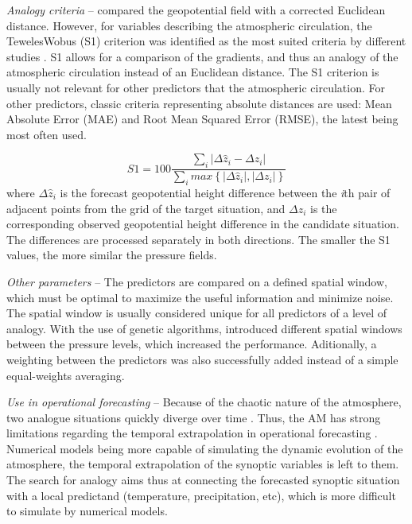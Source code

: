 \documentclass[review]{elsarticle}
\begin{document}
\textit{Analogy criteria} -- \citet{Lorenz1969} compared the geopotential field with a corrected Euclidean distance. However, for variables describing the atmospheric circulation, the Teweles\textendash Wobus (S1) criterion \citep[Eq. (\ref{eq:S1}), ][]{Teweles1954, Drosdowsky2003} was identified as the most suited criteria by different studies \citep{Wilson1980, Woodcock1980, Guilbaud1998, Bontron2004}. S1 allows for a comparison of the gradients, and thus an analogy of the atmospheric circulation instead of an Euclidean distance. The S1 criterion is usually not relevant for other predictors that the atmospheric circulation. For other predictors, classic criteria representing absolute distances are used: Mean Absolute Error (MAE) and Root Mean Squared Error (RMSE), the latest being most often used.

\begin{equation}
\label{eq:S1}
S1=100 \frac {\displaystyle \sum_{i} \vert \Delta\hat{z}_{i} - \Delta z_{i} \vert}
{\displaystyle \sum_{i} max\left\lbrace \vert \Delta\hat{z}_{i} \vert , \vert \Delta z_{i} \vert \right\rbrace }
\end{equation}
where $\Delta \hat{z}_{i}$ is the forecast geopotential height difference between the \textit{i}th pair of adjacent points from the grid of the target situation, and $\Delta z_{i}$ is the corresponding observed geopotential height difference in the candidate situation. The differences are processed separately in both directions. The smaller the S1 values, the more similar the pressure fields.

\textit{Other parameters} -- The predictors are compared on a defined spatial window, which must be optimal to maximize the useful information and minimize noise. The spatial window is usually considered unique for all predictors of a level of analogy. With the use of genetic algorithms, \citet{Horton2018a} introduced different spatial windows between the pressure levels, which increased the performance. Aditionally, a weighting between the predictors was also successfully added instead of a simple equal-weights averaging.

\textit{Use in operational forecasting} -- Because of the chaotic nature of the atmosphere, two analogue situations quickly diverge over time \citep{Lorenz1969}. Thus, the AM has strong limitations regarding the temporal extrapolation in operational forecasting \citep{Bontron2004}. Numerical models being more capable of simulating the dynamic evolution of the atmosphere, the temporal extrapolation of the synoptic variables is left to them. The search for analogy aims thus at connecting the forecasted synoptic situation with a local predictand (temperature, precipitation, etc), which is more difficult to simulate by numerical models.
\end{document}
